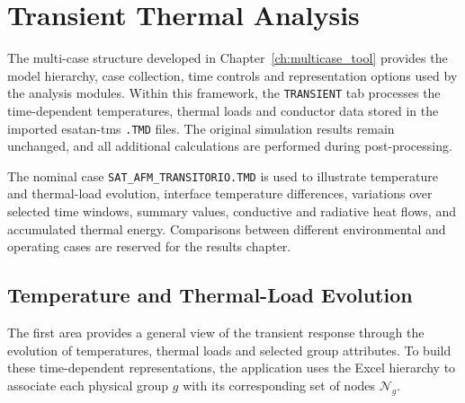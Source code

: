 \chapter[Transient Thermal Analysis]
{Transient Thermal Analysis}
\label{ch:transient_analysis}

The multi-case structure developed in
Chapter~\ref{ch:multicase_tool} provides the model hierarchy, case collection,
time controls and representation options used by the analysis modules. Within
this framework, the \texttt{TRANSIENT} tab processes the time-dependent
temperatures, thermal loads and conductor data stored in the imported
\acrshort{esatan-tms} \texttt{.TMD} files. The original simulation results
remain unchanged, and all additional calculations are performed during
post-processing.

The nominal case \texttt{SAT\_AFM\_TRANSITORIO.TMD} is used to
illustrate temperature and thermal-load evolution, interface temperature differences, variations over
selected time windows, summary values, conductive and radiative heat flows,
and accumulated thermal energy. Comparisons between different environmental
and operating cases are reserved for the results chapter.

\section{Temperature and Thermal-Load Evolution}
\label{sec:thermal_evolution}

The first area provides a general view of the transient response through the
evolution of temperatures, thermal loads and selected group attributes. To
build these time-dependent representations, the application uses the Excel
hierarchy to associate each physical group \(g\) with its corresponding set of
nodes \(\mathcal{N}_g\).

